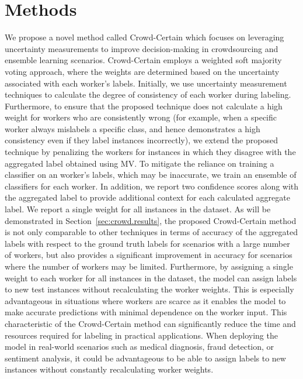 \section{Methods}\label{sec:crowd.method}
We propose a novel method called Crowd-Certain which focuses on leveraging uncertainty measurements to improve decision-making in crowdsourcing and ensemble learning scenarios. Crowd-Certain employs a weighted soft majority voting approach, where the weights are determined based on the uncertainty associated with each worker's labels. Initially, we use uncertainty measurement techniques to calculate the degree of consistency of each worker during labeling. Furthermore, to ensure that the proposed technique does not calculate a high weight for workers who are consistently wrong (for example, when a specific worker always mislabels a specific class, and hence demonstrates a high consistency even if they label instances incorrectly), we extend the proposed technique by penalizing the workers for instances in which they disagree with the aggregated label obtained using MV\@. To mitigate the reliance on training a classifier on an worker's labels, which may be inaccurate, we train an ensemble of classifiers for each worker. In addition, we report two confidence scores along with the aggregated label to provide additional context for each calculated aggregate label. We report a single weight for all instances in the dataset. As will be demonstrated in Section~\ref{sec:crowd.results}, the proposed Crowd-Certain method is not only comparable to other techniques in terms of accuracy of the aggregated labels with respect to the ground truth labels for scenarios with a large number of workers, but also provides a significant improvement in accuracy for scenarios where the number of workers may be limited. Furthermore, by assigning a single weight to each worker for all instances in the dataset, the model can assign labels to new test instances without recalculating the worker weights. This is especially advantageous in situations where workers are scarce as it enables the model to make accurate predictions with minimal dependence on the worker input. This characteristic of the Crowd-Certain method can significantly reduce the time and resources required for labeling in practical applications. When deploying the model in real-world scenarios such as medical diagnosis, fraud detection, or sentiment analysis, it could be advantageous to be able to assign labels to new instances without constantly recalculating worker weights.
